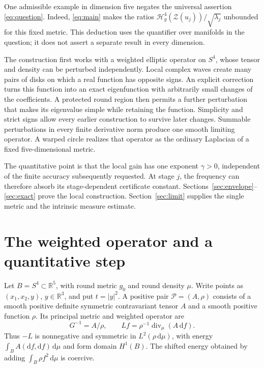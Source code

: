 \documentclass[11pt]{article}
\newcommand{\R}{\mathbb R}
\newcommand{\dd}{\mathrm d}
\newcommand{\HH}{\mathcal H}
\newcommand{\Div}{\operatorname{div}}
\newcommand{\Z}{\mathcal Z}
\theoremstyle{definition}
\theoremstyle{remark}
\numberwithin{equation}{section}
\begin{document}
One admissible example in dimension five negates the universal assertion
\eqref{eq:question}. Indeed, \eqref{eq:main} makes the ratios
\(\HH_g^4(\Z(u_j))/\sqrt{\lambda_j}\) unbounded for this fixed metric.
This deduction uses the quantifier over manifolds in the question; it
does not assert a separate result in every dimension.

The construction first works with a weighted elliptic operator on
\(S^4\), whose tensor and density can be perturbed independently. Local
complex waves create many pairs of disks on which a real function has
opposite signs. An explicit correction turns this function into an exact
eigenfunction with arbitrarily small changes of the coefficients. A
protected round region then permits a further perturbation that makes
its eigenvalue simple while retaining the function. Simplicity and
strict signs allow every earlier construction to survive later changes.
Summable perturbations in every finite derivative norm produce one
smooth limiting operator. A warped circle realizes that operator as the
ordinary Laplacian of a fixed five-dimensional metric.

The quantitative point is that the local gain has one exponent
\(\gamma>0\), independent of the finite accuracy subsequently requested.
At stage \(j\), the frequency can therefore absorb its stage-dependent
certificate constant. Sections~\ref{sec:envelope}--\ref{sec:exact}
prove the local construction. Section~\ref{sec:limit} supplies the
single metric and the intrinsic measure estimate.

\section{The weighted operator and a quantitative step}\label{sec:base}

Let \(B=S^4\subset\R^5\), with round metric \(g_0\) and round density
\(\mu\). Write points as \((x_1,x_2,y)\), \(y\in\R^3\), and put
\(t=|y|^2\). A positive pair \(\mathcal P=(A,\rho)\) consists of a
smooth positive definite symmetric contravariant tensor \(A\) and a
smooth positive function \(\rho\). Its principal metric and weighted
operator are
\begin{equation}\label{eq:operator}
 G^{-1}=A/\rho,\qquad
 Lf=\rho^{-1}\Div_\mu(A\,\dd f).
\end{equation}
Thus \(-L\) is nonnegative and symmetric in \(L^2(\rho\,\dd\mu)\),
with energy \(\int_B A(\dd f,\dd f)\,\dd\mu\) and form domain \(H^1(B)\).
The shifted energy obtained by adding
\(\int_B\rho f^2\,\dd\mu\) is coercive.
\end{document}
